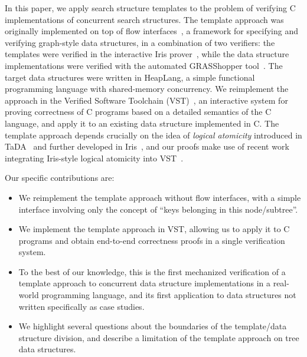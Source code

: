 \documentclass[a4paper,UKenglish,cleveref, autoref, thm-restate]{lipics-v2021}
\begin{document}

In this paper, we apply search structure templates to the problem of verifying C implementations of concurrent search structures. The template approach was originally implemented on top of flow interfaces~\cite{krishna2017flow}, a framework for specifying and verifying graph-style data structures, in a combination of two verifiers: the templates were verified in the interactive Iris prover~\cite{iris}, while the data structure implementations were verified with the automated GRASShopper tool~\cite{grasshopper}. The target data structures were written in HeapLang, a simple functional programming language with shared-memory concurrency. We reimplement the approach in the Verified Software Toolchain (VST)~\cite{plcc}, an interactive system for proving correctness of C programs based on a detailed semantics of the C language, and apply it to an existing data structure implemented in C. The template approach depends crucially on the idea of \emph{logical atomicity} introduced in TaDA~\cite{tada} and further developed in Iris~\cite{iris}, and our proofs make use of recent work integrating Iris-style logical atomicity into VST~\cite{iris-vst-arxiv}. %

Our specific contributions are:
\begin{itemize}
\item We reimplement the template approach without flow interfaces, with a simple interface involving only the concept of ``keys belonging in this node/subtree''.
\item We implement the template approach in VST, allowing us to apply it to C programs and obtain end-to-end correctness proofs in a single verification system.
\item To the best of our knowledge, this is the first mechanized verification of a template approach to concurrent data structure implementations in a real-world programming language, and its first application to data structures not written specifically as case studies.
\item We highlight several questions about the boundaries of the template/data structure division, and describe a limitation of the template approach on tree data structures.
\end{itemize}
\end{document}
